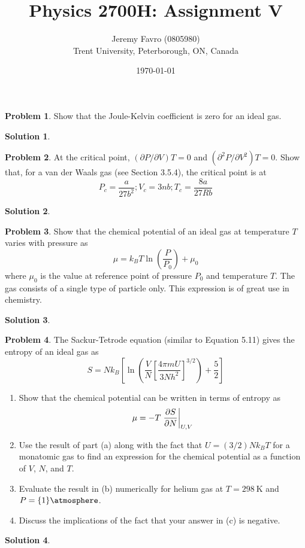 \documentclass[10pt]{article}
\title{Physics 2700H: Assignment V}
\author{Jeremy Favro (0805980) \\ Trent University, Peterborough, ON, Canada}
\date{\today}
\theoremstyle{definition}
\newtheorem{problem}{Problem}
\newtheorem{soln}{Solution}
\begin{document}
\maketitle

\begin{problem}
Show that the Joule-Kelvin coefficient is zero for an ideal gas.
\end{problem}
\begin{soln}
\end{soln}

\begin{problem}
At the critical point, $(\partial P/\partial V)T = 0$ and $(\partial^2 P/\partial V^2)T = 0$. Show that, for a
van der Waals gas (see Section 3.5.4), the critical point is at
$$P_c=\frac{a}{27b^2};V_c=3nb; T_c=\frac{8a}{27Rb}$$
\end{problem}
\begin{soln}
\end{soln}

\begin{problem}
Show that the chemical potential of an ideal gas at temperature $T$ varies with pressure as
$$\mu=k_B T\ln\left(\frac{P}{P_0}\right)+\mu_0$$
where $\mu_0$ is the value at reference point of pressure $P_0$ and temperature $T$. The gas consists of a single type of particle only.
This expression is of great use in chemistry.
\end{problem}
\begin{soln}
\end{soln}

\begin{problem}
The Sackur-Tetrode equation (similar to Equation 5.11) gives the entropy of an ideal gas as
$$S=Nk_B\left[\ln\left(\frac{V}{N}\left[\frac{4\pi mU}{3Nh^2}\right]^{3/2}\right)+\frac{5}{2}\right]$$
\begin{enumerate}[label=(\alph*)]
  \item Show that the chemical potential can be written in terms of entropy as
        $$\mu=-T\eval{\frac{\partial S}{\partial N}}_{U,V}$$
  \item Use the result of part (a) along with the fact that $U = (3/2)Nk_BT$ for
        a monatomic gas to find an expression for the chemical potential as
        a function of $V$, $N$, and $T$.
  \item Evaluate the result in (b) numerically for helium gas at $T = \qty{298}{\kelvin}$ and $P = \qty{1}{\atmosphere}$.
  \item Discuss the implications of the fact that your answer in (c) is negative.
\end{enumerate}
\end{problem}
\begin{soln}
\end{soln}
\end{document}

